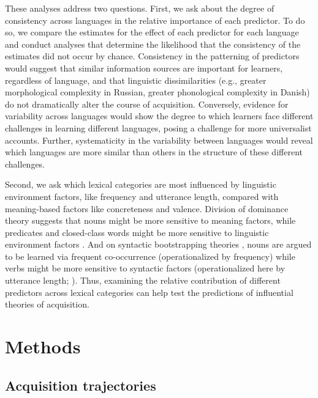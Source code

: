 \documentclass[
   11pt,
       ]{book}
\begin{document}
These analyses address two questions. First, we ask about the degree of consistency across languages in the relative importance of each predictor. To do so, we compare the estimates for the effect of each predictor for each language and conduct analyses that determine the likelihood that the consistency of the estimates did not occur by chance. Consistency in the patterning of predictors would suggest that similar information sources are important for learners, regardless of language, and that linguistic dissimilarities (e.g., greater morphological complexity in Russian, greater phonological complexity in Danish) do not dramatically alter the course of acquisition. Conversely, evidence for variability across languages would show the degree to which learners face different challenges in learning different languages, posing a challenge for more universalist accounts. Further, systematicity in the variability between languages would reveal which languages are more similar than others in the structure of these different challenges.

Second, we ask which lexical categories are most influenced by linguistic environment factors, like frequency and utterance length, compared with meaning-based factors like concreteness and valence. Division of dominance theory suggests that nouns might be more sensitive to meaning factors, while predicates and closed-class words might be more sensitive to linguistic environment factors \citep{gentner2001}. And on syntactic bootstrapping theories \citep{gleitman1990}, nouns are argued to be learned via frequent co-occurrence (operationalized by frequency) while verbs might be more sensitive to syntactic factors (operationalized here by utterance length; \citealt{snedeker2007}). Thus, examining the relative contribution of different predictors across lexical categories can help test the predictions of influential theories of acquisition.

\hypertarget{methods}{%
\section{Methods}\label{methods}}

\hypertarget{acquisition-trajectories}{%
\subsection{Acquisition trajectories}\label{acquisition-trajectories}}
\end{document}
